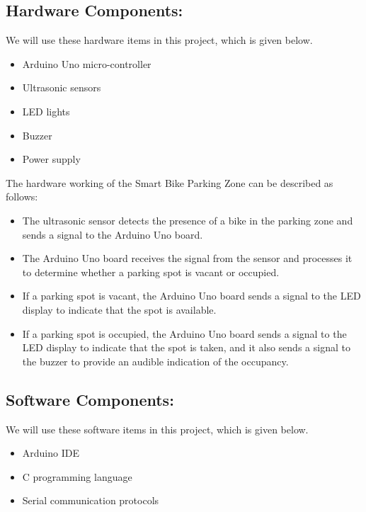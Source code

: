 \documentclass[conference]{IEEEtran}
\begin{document}
	\subsection{Hardware Components:}
	 We will use these hardware items in this project, which is given below.
	
	\begin{itemize}
	\item Arduino Uno micro-controller
	\item Ultrasonic sensors
	\item LED lights
	\item Buzzer
	\item Power supply
	\end{itemize}
The hardware working of the Smart Bike Parking Zone can be described as follows:
	\begin{itemize}
	\item The ultrasonic sensor detects the presence of a bike in the parking zone and sends a signal to the Arduino Uno board.
	\item The Arduino Uno board receives the signal from the sensor and processes it to determine whether a parking spot is vacant or occupied.
	\item If a parking spot is vacant, the Arduino Uno board sends a signal to the LED display to indicate that the spot is available.
	\item If a parking spot is occupied, the Arduino Uno board sends a signal to the LED display to indicate that the spot is taken, and it also sends a signal to the buzzer to provide an audible indication of the occupancy.
\end{itemize}


	\subsection{Software Components:}
	 We will use these software items in this project, which is given below.	
	\begin{itemize}
		\item Arduino IDE
		\item C programming language
		\item Serial communication protocols
	\end{itemize}
\end{document}
